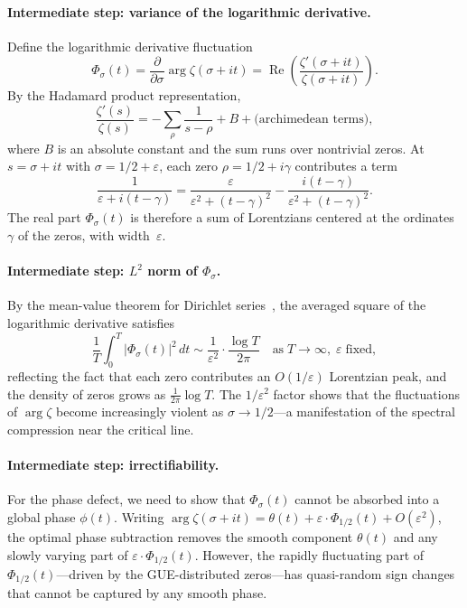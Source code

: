 \documentclass[11pt]{article}
\theoremstyle{remark}
\DeclareMathOperator{\Rea}{Re}
\begin{document}
\paragraph{Intermediate step: variance of the logarithmic derivative.}
Define the logarithmic derivative fluctuation
\[
  \Phi_\sigma(t) = \frac{\partial}{\partial\sigma}\arg\zeta(\sigma+it)
  = \Rea\!\left(\frac{\zeta'(\sigma+it)}{\zeta(\sigma+it)}\right).
\]
By the Hadamard product representation,
\[
  \frac{\zeta'(s)}{\zeta(s)}
  = -\sum_\rho \frac{1}{s-\rho} + B + \text{(archimedean terms)},
\]
where $B$ is an absolute constant and the sum runs over nontrivial zeros.
At $s=\sigma+it$ with $\sigma=1/2+\varepsilon$, each zero
$\rho=1/2+i\gamma$ contributes a term
\[
  \frac{1}{\varepsilon+i(t-\gamma)}
  = \frac{\varepsilon}{\varepsilon^2+(t-\gamma)^2}
  - \frac{i(t-\gamma)}{\varepsilon^2+(t-\gamma)^2}.
\]
The real part $\Phi_\sigma(t)$ is therefore a sum of Lorentzians centered at
the ordinates $\gamma$ of the zeros, with width~$\varepsilon$.

\paragraph{Intermediate step: $L^2$ norm of $\Phi_\sigma$.}
By the mean-value theorem for Dirichlet series~\cite{Titchmarsh}, the averaged
square of the logarithmic derivative satisfies
\begin{equation}\label{eq:logderiv-L2}
  \frac{1}{T}\int_0^T |\Phi_\sigma(t)|^2\,dt
  \sim \frac{1}{\varepsilon^2}\cdot\frac{\log T}{2\pi}
  \quad\text{as}\; T\to\infty,\; \varepsilon\;\text{fixed},
\end{equation}
reflecting the fact that each zero contributes an $O(1/\varepsilon)$ Lorentzian
peak, and the density of zeros grows as $\frac{1}{2\pi}\log T$.
The $1/\varepsilon^2$ factor shows that the fluctuations of $\arg\zeta$ become
increasingly violent as $\sigma\to 1/2$---a manifestation of the spectral
compression near the critical line.

\paragraph{Intermediate step: irrectifiability.}
For the phase defect, we need to show that $\Phi_\sigma(t)$ cannot be absorbed
into a global phase $\phi(t)$.
Writing $\arg\zeta(\sigma+it)=\theta(t)+\varepsilon\cdot\Phi_{1/2}(t)+O(\varepsilon^2)$,
the optimal phase subtraction removes the smooth component $\theta(t)$ and any
slowly varying part of $\varepsilon\cdot\Phi_{1/2}(t)$.
However, the rapidly fluctuating part of $\Phi_{1/2}(t)$---driven by the GUE-distributed
zeros---has quasi-random sign changes that cannot be captured by any smooth phase.
\end{document}
